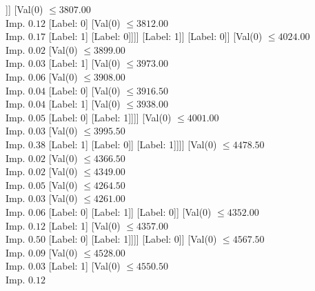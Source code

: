 \documentclass[margin=10pt]{standalone}
\begin{document}
\begin{forest}
																			[Label: 1]
																			[Label: 0]]]
																	[Val($0$) $ \leq 3807.00$ \\ Imp. $0.12$
																		[Label: 0]
																		[Val($0$) $ \leq 3812.00$ \\ Imp. $0.17$
																			[Label: 1]
																			[Label: 0]]]]
																[Label: 1]]
															[Label: 0]]
														[Val($0$) $ \leq 4024.00$ \\ Imp. $0.02$
															[Val($0$) $ \leq 3899.00$ \\ Imp. $0.03$
																[Label: 1]
																[Val($0$) $ \leq 3973.00$ \\ Imp. $0.06$
																	[Val($0$) $ \leq 3908.00$ \\ Imp. $0.04$
																		[Label: 0]
																		[Val($0$) $ \leq 3916.50$ \\ Imp. $0.04$
																			[Label: 1]
																			[Val($0$) $ \leq 3938.00$ \\ Imp. $0.05$
																				[Label: 0]
																				[Label: 1]]]]
																	[Val($0$) $ \leq 4001.00$ \\ Imp. $0.03$
																		[Val($0$) $ \leq 3995.50$ \\ Imp. $0.38$
																			[Label: 1]
																			[Label: 0]]
																		[Label: 1]]]]
															[Val($0$) $ \leq 4478.50$ \\ Imp. $0.02$
																[Val($0$) $ \leq 4366.50$ \\ Imp. $0.02$
																	[Val($0$) $ \leq 4349.00$ \\ Imp. $0.05$
																		[Val($0$) $ \leq 4264.50$ \\ Imp. $0.03$
																			[Val($0$) $ \leq 4261.00$ \\ Imp. $0.06$
																				[Label: 0]
																				[Label: 1]]
																			[Label: 0]]
																		[Val($0$) $ \leq 4352.00$ \\ Imp. $0.12$
																			[Label: 1]
																			[Val($0$) $ \leq 4357.00$ \\ Imp. $0.50$
																				[Label: 0]
																				[Label: 1]]]]
																	[Label: 0]]
																[Val($0$) $ \leq 4567.50$ \\ Imp. $0.09$
																	[Val($0$) $ \leq 4528.00$ \\ Imp. $0.03$
																		[Label: 1]
																		[Val($0$) $ \leq 4550.50$ \\ Imp. $0.12$

\end{forest}
\end{document}
